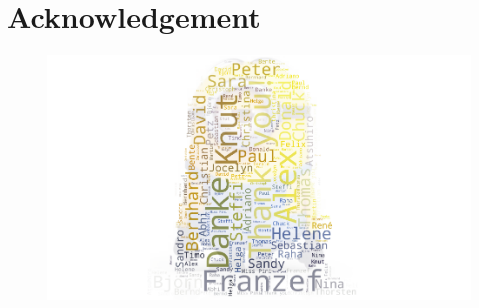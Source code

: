 \chapter*{Acknowledgement}
\label{sec:acknowledgement}
\vspace*{-10mm}

\begin{figure}[h]
	\centering
	\includegraphics[width=1.0\textwidth]{util/ack.pdf}
\end{figure}

